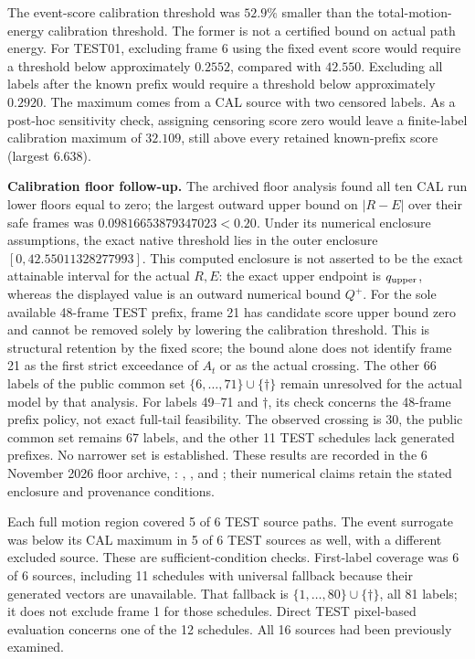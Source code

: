 \documentclass[11pt]{article}
\theoremstyle{noteplain}
\newcommand{\dates}[2]{\{#1,\ldots,#2\}}
\newcommand{\dd}{\dagger}
\begin{document}
The event-score calibration threshold was $52.9\%$ smaller than the total-motion-energy calibration threshold. The former is not a certified bound on actual path energy. For TEST01, excluding frame 6 using the fixed event score would require a threshold below approximately $0.2552$, compared with $42.550$. Excluding all labels after the known prefix would require a threshold below approximately $0.2920$. The maximum comes from a CAL source with two censored labels. As a post-hoc sensitivity check, assigning censoring score zero would leave a finite-label calibration maximum of $32.109$, still above every retained known-prefix score (largest $6.638$).

\textbf{Calibration floor follow-up.} The archived floor analysis found all ten CAL run lower floors equal to zero; the largest outward upper bound on $|R-E|$ over their safe frames was $0.09816653879347023<0.20$. Under its numerical enclosure assumptions, the exact native threshold lies in the outer enclosure $[0,42.55011328277993]$. This computed enclosure is not asserted to be the exact attainable interval for the actual $R,E$: the exact upper endpoint is $q_{\rm upper}$, whereas the displayed value is an outward numerical bound $Q^+$. For the sole available 48-frame TEST prefix, frame 21 has candidate score upper bound zero and cannot be removed solely by lowering the calibration threshold. This is structural retention by the fixed score; the bound alone does not identify frame 21 as the first strict exceedance of $A_t$ or as the actual crossing. The other 66 labels of the public common set $\dates{6}{71}\cup\{\dd\}$ remain unresolved for the actual model by that analysis. For labels 49--71 and $\dd$, its check concerns the 48-frame prefix policy, not exact full-tail feasibility. The observed crossing is 30, the public common set remains 67 labels, and the other 11 TEST schedules lack generated prefixes. No narrower set is established. These results are recorded in the 6 November 2026 floor archive, \allowbreak{}: , , and ; their numerical claims retain the stated enclosure and provenance conditions.

Each full motion region covered 5 of 6 TEST source paths. The event surrogate was below its CAL maximum in 5 of 6 TEST sources as well, with a different excluded source. These are sufficient-condition checks. First-label coverage was 6 of 6 sources, including 11 schedules with universal fallback because their generated vectors are unavailable. That fallback is $\dates{1}{80}\cup\{\dd\}$, all 81 labels; it does not exclude frame 1 for those schedules. Direct TEST pixel-based evaluation concerns one of the 12 schedules. All 16 sources had been previously examined.
\end{document}
